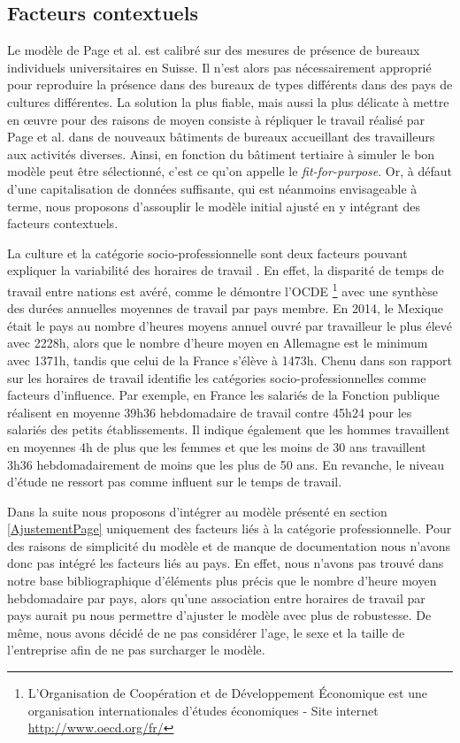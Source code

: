\subsection{Facteurs contextuels}
\label{Facteurs contextuels}

Le modèle de Page et al.\cite{Page-08} est calibré sur des mesures de présence de bureaux individuels universitaires en Suisse. Il n'est alors pas nécessairement approprié pour reproduire la présence dans des bureaux de types différents dans des pays de cultures différentes. La solution la plus fiable, mais aussi la plus délicate à mettre en œuvre pour des raisons de moyen consiste à répliquer le travail réalisé par Page et al.\cite{Page-08} dans de nouveaux bâtiments de bureaux accueillant des travailleurs aux activités diverses. Ainsi, en fonction du bâtiment tertiaire à simuler le bon modèle peut être sélectionné, c'est ce qu'on appelle le \textit{fit-for-purpose}. Or, à défaut d'une capitalisation de données suffisante, qui est néanmoins envisageable à terme, nous proposons d'assouplir le modèle initial ajusté en y intégrant des facteurs contextuels.

La culture et la catégorie socio-professionnelle sont deux facteurs pouvant expliquer la variabilité des horaires de travail \cite{Annex-53-1}. En effet, la disparité de temps de travail entre nations est avéré, comme le démontre l'OCDE \footnote{L'Organisation de Coopération et de Développement Économique est une organisation internationales d'études économiques - Site internet \url{http://www.oecd.org/fr/}}\cite{OECD-14} avec une synthèse des durées annuelles moyennes de travail par pays membre. En 2014, le Mexique était le pays au nombre d'heures moyens annuel ouvré par travailleur le plus élevé avec 2228h, alors que le nombre d'heure moyen en Allemagne est le minimum avec 1371h, tandis que celui de la France s'élève à 1473h. Chenu \cite{Chenu-02} dans son rapport sur les horaires de travail identifie les catégories socio-professionnelles comme facteurs d'influence. Par exemple, en France les salariés de la Fonction publique réalisent en moyenne 39h36 hebdomadaire de travail contre 45h24 pour les salariés des petits établissements. Il indique également que les hommes travaillent en moyennes 4h de plus que les femmes et que les moins de 30 ans travaillent 3h36 hebdomadairement de moins que les plus de 50 ans. En revanche, le niveau d'étude ne ressort pas comme influent sur le temps de travail.

Dans la suite nous proposons d'intégrer au modèle présenté en section \ref{AjustementPage} uniquement des facteurs liés à la catégorie professionnelle. Pour des raisons de simplicité du modèle et de manque de documentation nous n'avons donc pas intégré les facteurs liés au pays. En effet, nous n'avons pas trouvé dans notre base bibliographique d'éléments plus précis que le nombre d'heure moyen hebdomadaire par pays, alors qu'une association entre horaires de travail par pays aurait pu nous permettre d'ajuster le modèle avec plus de robustesse. De même, nous avons décidé de ne pas considérer l'age, le sexe et la taille de l'entreprise afin de ne pas surcharger le modèle.

